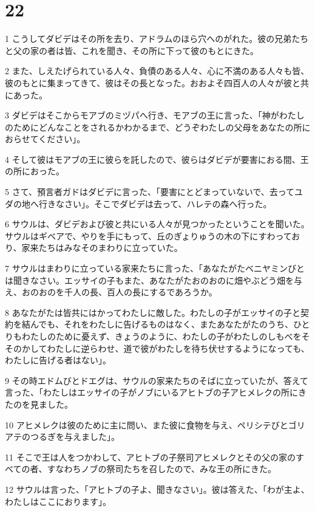 \chapter{22}

\par 1 こうしてダビデはその所を去り、アドラムのほら穴へのがれた。彼の兄弟たちと父の家の者は皆、これを聞き、その所に下って彼のもとにきた。
\par 2 また、しえたげられている人々、負債のある人々、心に不満のある人々も皆、彼のもとに集まってきて、彼はその長となった。おおよそ四百人の人々が彼と共にあった。
\par 3 ダビデはそこからモアブのミヅパへ行き、モアブの王に言った、「神がわたしのためにどんなことをされるかわかるまで、どうぞわたしの父母をあなたの所におらせてください」。
\par 4 そして彼はモアブの王に彼らを託したので、彼らはダビデが要害におる間、王の所におった。
\par 5 さて、預言者ガドはダビデに言った、「要害にとどまっていないで、去ってユダの地へ行きなさい」。そこでダビデは去って、ハレテの森へ行った。
\par 6 サウルは、ダビデおよび彼と共にいる人々が見つかったということを聞いた。サウルはギベアで、やりを手にもって、丘のぎょりゅうの木の下にすわっており、家来たちはみなそのまわりに立っていた。
\par 7 サウルはまわりに立っている家来たちに言った、「あなたがたベニヤミンびとは聞きなさい。エッサイの子もまた、あなたがたおのおのに畑やぶどう畑を与え、おのおのを千人の長、百人の長にするであろうか。
\par 8 あなたがたは皆共にはかってわたしに敵した。わたしの子がエッサイの子と契約を結んでも、それをわたしに告げるものはなく、またあなたがたのうち、ひとりもわたしのために憂えず、きょうのように、わたしの子がわたしのしもべをそそのかしてわたしに逆らわせ、道で彼がわたしを待ち伏せするようになっても、わたしに告げる者はない」。
\par 9 その時エドムびとドエグは、サウルの家来たちのそばに立っていたが、答えて言った、「わたしはエッサイの子がノブにいるアヒトブの子アヒメレクの所にきたのを見ました。
\par 10 アヒメレクは彼のために主に問い、また彼に食物を与え、ペリシテびとゴリアテのつるぎを与えました」。
\par 11 そこで王は人をつかわして、アヒトブの子祭司アヒメレクとその父の家のすべての者、すなわちノブの祭司たちを召したので、みな王の所にきた。
\par 12 サウルは言った、「アヒトブの子よ、聞きなさい」。彼は答えた、「わが主よ、わたしはここにおります」。

